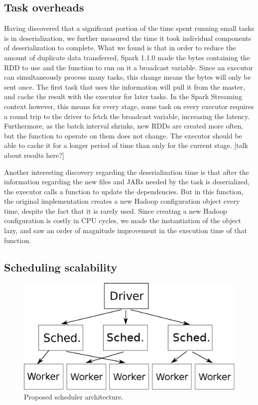 \subsection{Task overheads}
Having discovered that a significant portion of the time spent running small tasks is in deserialization, we further measured the time it took individual components of deserialization to complete. What we found is that in order to reduce the amount of duplicate data transferred, Spark 1.1.0 made the bytes containing the RDD to use and the function to run on it a broadcast variable. Since an executor can simultaneously process many tasks, this change means the bytes will only be sent once. The first task that uses the information will pull it from the master, and cache the result with the executor for later tasks. In the Spark Streaming context however, this means for every stage, some task on every executor requires a round trip to the driver to fetch the broadcast variable, increasing the latency. Furthermore, as the batch interval shrinks, new RDDs are created more often, but the function to operate on them does not change. The executor should be able to cache it for a longer period of time than only for the current stage. [talk about results here?]

Another interesting discovery regarding the deserialization time is that after the information regarding the new files and JARs needed by the task is deserialized, the executor calls a function to update the dependencies. But in this function, the original implementation creates a new Hadoop configuration object every time, despite the fact that it is rarely used. Since creating a new Hadoop configuration is costly in CPU cycles, we made the instantiation of the object lazy, and saw an order of magnitude improvement in the execution time of that function.


\subsection{Scheduling scalability}

\begin{figure}[h!]
  \begin{center}
    \includegraphics[scale=0.45]{scheduler_architecture.eps}
  \end{center}
  \caption{Proposed scheduler architecture.}
  \label{fig:schedarch}
\end{figure}

